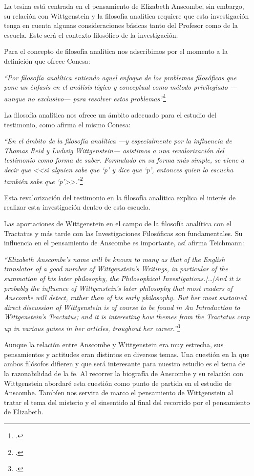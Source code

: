 \documentclass[11pt]{article}
\begin{document}
La tesina está centrada en el pensamiento de Elizabeth Anscombe, sin embargo, su relación con Wittgenstein y la filosofía analítica requiere que esta investigación tenga en cuenta algunas consideraciones básicas tanto del Profesor como de la escuela. Este será el contexto filosófico de la investigación.

Para el concepto de filosofía analítica nos adscribimos por el momento a la definición que ofrece Conesa:

\emph{
``Por filosofía analítica entiendo aquel enfoque de los problemas filosóficos que pone un énfasis en el análisis lógico y conceptual como método privilegiado \mbox{---aunque} no \mbox{exclusivo---} para resolver estos problemas''}\footcite[16]{cyc}

La filosofía analítica nos ofrece un ámbito adecuado para el estudio del testimonio, como afirma el mismo Conesa:

\emph{
``En el ámbito de la filosofía analítica ---y especialmente por la influencia de Thomas Reid y Ludwig Wittgenstein--- asistimos a una revalorización del testimonio como forma de saber. Formulado en su forma más simple, se viene a decir que <<si alguien sabe que `p' y dice que `p', entonces quien lo escucha también sabe que `p'>>.''}\footcite[487]{feylogicaconesa}

Esta revalorización del testimonio en la filosofía analítica explica el interés de realizar esta investigación dentro de esta escuela. 

Las aportaciones de Wittgenstein en el campo de la filosofía analítica con el Tractatus y más tarde con las Investigaciones Filosóficas son fundamentales. Su influencia en el pensamiento de Anscombe es importante, así afirma Teichmann:

\emph{
``Elizabeth Anscombe's name will be known to many as that of the English translator of a good number of Wittgenstein's Writings, in particular of the summation of his later philosophy, the Philosophical Investigations.[\ldots]And it is probably the influence of Wittgenstein's later philosophy that most readers of Anscombe will detect, rather than of his early philosophy. But her most sustained direct discussion of Wittgenstein is of course to be found in An Introduction to Wittgenstein's Tractatus; and it is interesting how themes from the Tractatus crop up in various guises in her articles, troughout her career.''}\footcite[191]{teichmann}

Aunque la relación entre Anscombe y Wittgenstein era muy estrecha, sus pensamientos y actitudes eran distintos en diversos temas. Una cuestión en la que ambos filósofos difieren y que será interesante para nuestro estudio es el tema de la razonabilidad de la fe. Al recorrer la biografía de Anscombe y su relación con Wittgenstein abordaré esta cuestión como punto de partida en el estudio de Anscombe. Tambíen nos servira de marco el pensamiento de Wittgenstein al tratar el tema del misterio y el sinsentido al final del recorrido por el pensamiento de Elizabeth.
\end{document}
